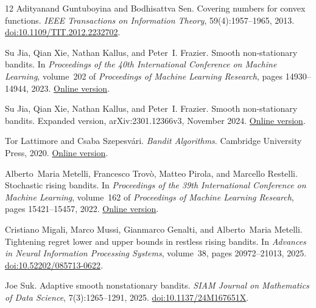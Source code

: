 \documentclass[11pt]{article}
\theoremstyle{remark}
\begin{document}
{\begin{thebibliography}{12}
Adityanand Guntuboyina and Bodhisattva Sen.
\newblock Covering numbers for convex functions.
\newblock \emph{IEEE Transactions on Information Theory}, 59(4):1957--1965, 2013.
\newblock \href{https://doi.org/10.1109/TIT.2012.2232702}{doi:10.1109/TIT.2012.2232702}.

Su Jia, Qian Xie, Nathan Kallus, and Peter~I. Frazier.
\newblock Smooth non-stationary bandits.
\newblock In \emph{Proceedings of the 40th International Conference on Machine
Learning}, volume~202 of \emph{Proceedings of Machine Learning Research},
pages 14930--14944, 2023.
\newblock \href{https://proceedings.mlr.press/v202/jia23c.html}{Online version}.

Su Jia, Qian Xie, Nathan Kallus, and Peter~I. Frazier.
\newblock Smooth non-stationary bandits.
\newblock Expanded version, arXiv:2301.12366v3, November 2024.
\newblock \href{https://arxiv.org/abs/2301.12366v3}{Online version}.

Tor Lattimore and Csaba Szepesv\'ari.
\newblock \emph{Bandit Algorithms}.
\newblock Cambridge University Press, 2020.
\newblock \href{https://tor-lattimore.com/downloads/book/book.pdf}{Online version}.

Alberto~Maria Metelli, Francesco Trov\`o, Matteo Pirola, and Marcello Restelli.
\newblock Stochastic rising bandits.
\newblock In \emph{Proceedings of the 39th International Conference on Machine
Learning}, volume~162 of \emph{Proceedings of Machine Learning Research},
pages 15421--15457, 2022.
\newblock \href{https://proceedings.mlr.press/v162/metelli22a.html}{Online version}.

Cristiano Migali, Marco Mussi, Gianmarco Genalti, and Alberto~Maria Metelli.
\newblock Tightening regret lower and upper bounds in restless rising bandits.
\newblock In \emph{Advances in Neural Information Processing Systems},
volume~38, pages 20972--21013, 2025.
\newblock \href{https://doi.org/10.52202/085713-0622}{doi:10.52202/085713-0622}.

Joe Suk.
\newblock Adaptive smooth nonstationary bandits.
\newblock \emph{SIAM Journal on Mathematics of Data Science}, 7(3):1265--1291, 2025.
\newblock \href{https://doi.org/10.1137/24M167651X}{doi:10.1137/24M167651X}.

\end{thebibliography}

}
\end{document}
